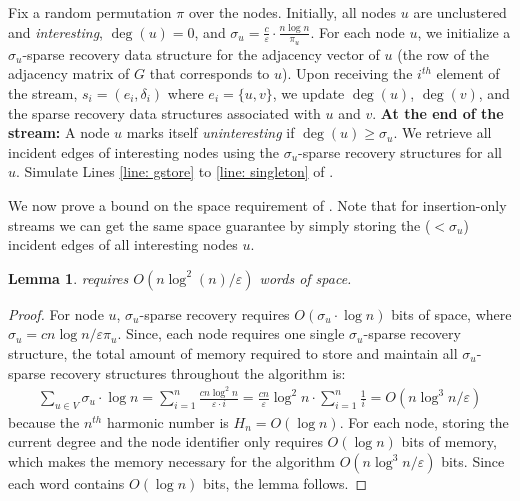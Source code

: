 \documentclass[10pt,a4paper]{article}
\newtheorem{lemma}{Lemma}[section]
\newcommand{\truncatedpivot}{\textrm{Truncated-Pivot}\xspace}
\newcommand{\eps}{\ensuremath{\varepsilon}}
\let\oldnl\nl%
\newcommand{\nonl}{\renewcommand{\nl}{\let\nl\oldnl}}%
\begin{document}
{\begin{algorithm}[tbh]
   \setcounter{AlgoLine}{0}
\caption{Dynamic Semi-Streaming \truncatedpivot}\label{alg:dynamic-delta-pivot}
    Fix a random permutation $\pi$ over the nodes. \;
    Initially, all nodes $u$ are unclustered and \emph{interesting}, $\deg(u) = 0$, and $\sigma_u = \frac{c}{\eps} \cdot \frac{n\log n}{\pi_u}$. \;
    For each node $u$, we initialize a $\sigma_u$-sparse recovery data structure for the adjacency vector of $u$ (the row of the adjacency matrix of $G$ that corresponds to $u$). \;
    Upon receiving the $i^{th}$ element of the stream, $s_i = (e_i, \delta_i)$ where $e_i=\{u,v\}$, we update $\deg(u)$, $\deg(v)$, and the sparse recovery data structures associated with $u$ and $v$. \;
  \nonl  \textbf{At the end of the stream:}\;
    A node $u$ marks itself \emph{uninteresting} if $\deg(u) \geq \sigma_{u}$. \;
    We retrieve all incident edges of interesting nodes using the ${\sigma_u}$-sparse recovery structures for all $u$. \;
    Simulate Lines \ref{line: gstore} to \ref{line: singleton} of .\;
\end{algorithm} 
We now prove a bound on the space requirement of . Note that for insertion-only streams we can get the same space guarantee by simply storing the ($<\sigma_u$) incident edges of all interesting nodes $u$.

\begin{lemma}\label{lem: space-req-dynamic-alg}
     requires $O(n\log^2 (n)/\eps)$ words of space. 
\end{lemma}
\begin{proof}
    For node $u$, ${\sigma_u}$-sparse recovery requires $O(\sigma_u\cdot\log n)$ bits of space, where $\sigma_u = c n\log n / \eps \pi_u$. 
    Since, each node requires one single ${\sigma_u}$-sparse recovery structure, the total amount of memory required to store and maintain all ${\sigma_u}$-sparse recovery structures throughout the algorithm is: 
    \begin{align*}
        \sum_{u\in V} \sigma_u\cdot \log n = \sum_{i=1}^n \frac{c n\log^2 n}{\eps\cdot i} = \frac{cn}{\eps}\log^2n \cdot \sum_{i=1}^n\frac{1}{i} = O(n\log^3 n/\eps)
    \end{align*}
    because the $n^{th}$ harmonic number is $H_n = O(\log n)$. 
    For each node, storing the current degree and the node identifier only requires $O(\log n)$ bits of memory, which makes the memory necessary for the algorithm $O(n\log^3 n/\eps)$ bits. 
    Since each word contains $O(\log n)$ bits, the lemma follows.
\end{proof}

}
\end{document}
